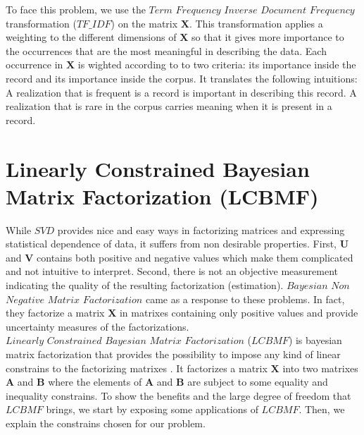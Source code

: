 To face this problem, we use the $Term$ $Frequency$ $Inverse$ $Document$ $Frequency$ transformation ($TF\_IDF$) \cite{tfidf} on the matrix $\boldsymbol{X}$. This transformation applies a weighting to the different dimensions of $\boldsymbol{X}$ so that it gives more importance to the occurrences that are the most meaningful in describing the data. Each occurrence in $\boldsymbol{X}$ is wighted according to to two criteria: its importance inside the record and its importance inside the corpus. It translates the following intuitions: A realization that is frequent is a record is important in describing this record. A realization that is rare in the corpus carries meaning when it is present in a record.


\section{Linearly Constrained Bayesian Matrix Factorization (LCBMF)}

While $SVD$ provides nice and easy ways in factorizing matrices and expressing statistical dependence of data, it suffers from non desirable properties. First, $\boldsymbol{U}$ and $\boldsymbol{V}$ contains both positive and negative values which make them complicated and not intuitive to interpret. Second, there is not an objective measurement indicating the quality of the resulting factorization (estimation). $Bayesian$ $Non$ $Negative$ $Matrix$ $Factorization$ \cite{bnmf} came as a response to these problems. In fact, they factorize a matrix $\boldsymbol{X}$ in matrixes containing only positive values and provide uncertainty measures of the factorizations. 
\\$Linearly$ $Constrained$ $Bayesian$ $Matrix$ $Factorization$ ($LCBMF$) is bayesian matrix factorization that provides the possibility to impose any kind of linear constrains to the factorizing matrixes \cite{lcbmf}. It factorizes a matrix $\boldsymbol{X}$ into two matrixes $\boldsymbol{A}$ and $\boldsymbol{B}$ where the elements of $\boldsymbol{A}$ and $\boldsymbol{B}$ are subject to some equality and inequality constrains. To show the benefits and the large degree of freedom that $LCBMF$ brings, we start by exposing some applications of $LCBMF$. Then, we explain the constrains chosen for our problem.
 
